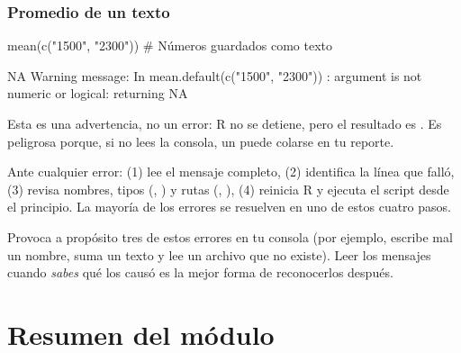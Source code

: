 \subsubsection{Promedio de un texto}

\begin{rnoejecutar}
mean(c("1500", "2300"))          # Números guardados como texto
\end{rnoejecutar}
\begin{rsalida}
[1] NA
Warning message:
In mean.default(c("1500", "2300")) :
  argument is not numeric or logical: returning NA
\end{rsalida}

Esta es una advertencia, no un error: R no se detiene, pero el resultado
es . Es peligrosa porque, si no lees la consola, un
 puede colarse en tu reporte.

\begin{consejo}
Ante cualquier error: (1) lee el mensaje completo, (2) identifica la línea
que falló, (3) revisa nombres, tipos (, ) y
rutas (, ), (4) reinicia R y ejecuta el
script desde el principio. La mayoría de los errores se resuelven en uno de
estos cuatro pasos.
\end{consejo}

\begin{hazlotu}
Provoca a propósito tres de estos errores en tu consola (por ejemplo,
escribe mal un nombre, suma un texto y lee un archivo que no existe). Leer
los mensajes cuando \emph{sabes} qué los causó es la mejor forma de
reconocerlos después.
\end{hazlotu}

\section{Resumen del módulo}
\label{sec:m1-resumen}

